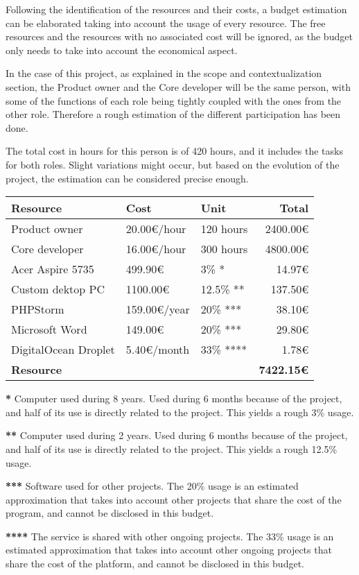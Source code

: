 Following the identification of the resources and their costs, a budget estimation can be elaborated taking into account the usage of every resource. The free resources and the resources with no associated cost will be ignored, as the budget only needs to take into account the economical aspect.

In the case of this project, as explained in the scope and contextualization section, the Product owner and the Core developer will be the same person, with some of the functions of each role being tightly coupled with the ones from the other role. Therefore a rough estimation of the different participation has been done.

The total cost in hours for this person is of 420 hours, and it includes the tasks for both roles. Slight variations might occur, but based on the evolution of the project, the estimation can be considered precise enough.
\hfill\break
\begin{center}
    \begin{tabular}{ | l | l | l | r |}
    	\hline
 		\textbf{Resource} & \textbf{Cost} & \textbf{Unit} & \textbf{Total} \\ \hline
 		Product owner & 20.00\euro{}/hour & 120 hours & 2400.00\euro{} \\ \hline
 		Core developer & 16.00\euro{}/hour & 300 hours & 4800.00\euro{} \\ \hline
 		Acer Aspire 5735 & 499.90\euro{} & 3\% * & 14.97\euro{} \\ \hline
 		Custom dektop PC & 1100.00\euro{} & 12.5\% ** & 137.50\euro{} \\ \hline
 		PHPStorm & 159.00\euro{}/year & 20\% *** & 38.10\euro{} \\ \hline
 		Microsoft Word & 149.00\euro{} & 20\% *** & 29.80\euro{} \\ \hline
 		DigitalOcean Droplet & 5.40\euro{}/month & 33\% **** & 1.78\euro{} \\ \hline
 		\textbf{Resource} &  &  & \textbf{7422.15\euro{}} \\ \hline
    \end{tabular}
\end{center}
\hfill\break
{\tiny \textbf{*} Computer used during 8 years. Used during 6 months because of the project, and half of its use is directly related to the project. This yields a rough 3\% usage.}

{\tiny \textbf{**} Computer used during 2 years. Used during 6 months because of the project, and half of its use is directly related to the project. This yields a rough 12.5\% usage.}

{\tiny \textbf{***} Software used for other projects. The 20\% usage is an estimated approximation that takes into account other projects that share the cost of the program, and cannot be disclosed in this budget.}

{\tiny \textbf{****} The service is shared with other ongoing projects. The 33\% usage is an estimated approximation that takes into account other ongoing projects that share the cost of the platform, and cannot be disclosed in this budget.}